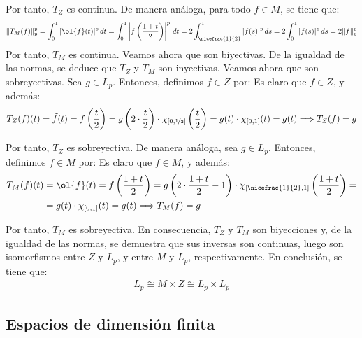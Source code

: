 \begin{ejercicio}
    Por tanto, $T_Z$ es continua. De manera análoga, para todo $f \in M$, se tiene que:
    \begin{align*}
        \|T_M(f)\|_p^p = \int_{0}^1 |\ol{f}(t)|^p\,dt = \int_{0}^1 \left|f\left(\frac{1+t}{2}\right)\right|^p\,dt = 2 \int_{\nicefrac{1}{2}}^{1} |f(s)|^p\,ds = 2 \int_{0}^{1} |f(s)|^p\,ds = 2 \|f\|_p^p
    \end{align*}
    Por tanto, $T_M$ es continua. Veamos ahora que son biyectivas. De la igualdad de las normas, se deduce que $T_Z$ y $T_M$ son inyectivas. Veamos ahora que son sobreyectivas. Sea $g \in L_p$. Entonces, definimos $f \in Z$ por:
    Es claro que $f \in Z$, y además:
    \begin{align*}
        T_Z(f)(t) = \tilde{f}(t) = f\left(\frac{t}{2}\right) = g\left(2 \cdot \frac{t}{2}\right)\cdot \chi_{[0, \nicefrac{1}{2}]}\left(\frac{t}{2}\right) = g(t)\cdot \chi_{[0, 1]}(t) = g(t) \Longrightarrow T_Z(f) = g
    \end{align*}

    Por tanto, $T_Z$ es sobreyectiva. De manera análoga, sea $g \in L_p$. Entonces, definimos $f \in M$ por:
    Es claro que $f \in M$, y además:
    \begin{align*}
        T_M(f)(t) &= \ol{f}(t) = f\left(\frac{1+t}{2}\right) = g\left(2 \cdot \frac{1+t}{2}-1\right)\cdot \chi_{[\nicefrac{1}{2}, 1]}\left(\frac{1+t}{2}\right) =\\&= g(t)\cdot \chi_{[0, 1]}(t) = g(t) \Longrightarrow T_M(f) = g
    \end{align*}

    Por tanto, $T_M$ es sobreyectiva. En consecuencia, $T_Z$ y $T_M$ son biyecciones y, de la igualdad de las normas, se demuestra que sus inversas son continuas, luego son isomorfismos entre $Z$ y $L_p$, y entre $M$ y $L_p$, respectivamente. En conclusión, se tiene que:
    \begin{align*}
        L_p \cong M \times Z \cong L_p \times L_p
    \end{align*}
\end{ejercicio}

\newpage\subsection{Espacios de dimensión finita}

